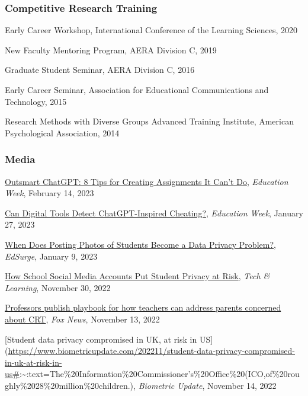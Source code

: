 \documentclass[
  14,
]{article}
\begin{document}
\hypertarget{competitive-research-training}{%
\subsubsection{Competitive Research
Training}\label{competitive-research-training}}

Early Career Workshop, International Conference of the Learning
Sciences, 2020

New Faculty Mentoring Program, AERA Division C, 2019

Graduate Student Seminar, AERA Division C, 2016

Early Career Seminar, Association for Educational Communications and
Technology, 2015

Research Methods with Diverse Groups Advanced Training Institute,
American Psychological Association, 2014

\hypertarget{media}{%
\subsubsection{Media}\label{media}}

\href{https://www.edweek.org/technology/outsmart-chatgpt-8-tips-for-creating-assignments-it-cant-do/2023/02}{Outsmart
ChatGPT: 8 Tips for Creating Assignments It Can't Do}, \emph{Education
Week}, February 14, 2023

\href{https://www.edweek.org/technology/can-digital-tools-detect-chatgpt-inspired-cheating/2023/01}{Can
Digital Tools Detect ChatGPT-Inspired Cheating?}, \emph{Education Week},
January 27, 2023

\href{https://www.edsurge.com/news/2023-01-09-when-does-posting-photos-of-students-become-a-data-privacy-problem}{When
Does Posting Photos of Students Become a Data Privacy Problem?},
\emph{EdSurge}, January 9, 2023

\href{https://www.techlearning.com/news/are-school-social-media-accounts-putting-student-privacy-at-risk}{How
School Social Media Accounts Put Student Privacy at Risk}, \emph{Tech \&
Learning}, November 30, 2022

\href{https://www.foxnews.com/us/professors-publish-playbook-teachers-address-parents-concerned-crt}{Professors
publish playbook for how teachers can address parents concerned about
CRT}, \emph{Fox News}, November 13, 2022

{[}Student data privacy compromised in UK, at risk in
US{]}(\url{https://www.biometricupdate.com/202211/student-data-privacy-compromised-in-uk-at-risk-in-us\#}:\textasciitilde:text=The\%20Information\%20Commissioner's\%20Office\%20(ICO,of\%20roughly\%2028\%20million\%20children.),
\emph{Biometric Update}, November 14, 2022
\end{document}
